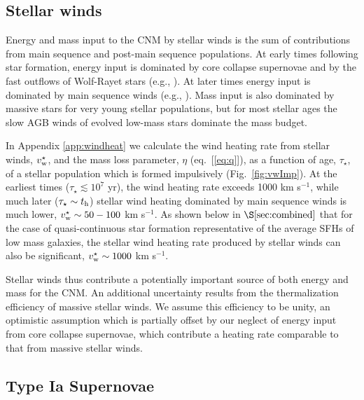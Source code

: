 \documentclass[usenatbib,fleqn]{mn2e}
\begin{document}
\subsection{Stellar winds} 

Energy and mass input to the CNM by stellar winds is the sum of contributions from main sequence and post-main sequence populations.  At early times following star formation, energy input is dominated by core collapse supernovae and by the fast outflows of Wolf-Rayet stars (e.g., \citealt{VossDiehl+:2009a}).  At later times energy input is dominated by main sequence winds (e.g., \citealt{NaimanSoares-Furtado+:2013a}).  Mass input is also dominated by massive stars for very young stellar populations, but for most stellar ages the slow AGB winds of evolved low-mass stars dominate the mass budget.  

In Appendix \ref{app:windheat} we calculate the wind heating rate from
stellar winds, $v_{\rm w}^{\star}$, and the mass loss parameter,
$\eta$ (eq.~[\ref{eq:q}]), as a function of age, $\tau_{\star}$, of a
stellar population which is formed impulsively (Fig.~\ref{fig:vwImp}).  
At the earliest times ($\tau_{\star} \lesssim 10^{7}$ yr), the wind
heating rate exceeds 1000 km s$^{-1}$, while much later ($\tau_{\star}
\sim t_{\rm h}$) stellar wind heating dominated by main sequence winds
is much lower, $v^{\star}_{\rm w} \sim 50-100 $ km s$^{-1}$.  As shown below in $\S\ref{sec:combined}$ that for the case of quasi-continuous star
formation representative of the average SFHs of low
mass galaxies, the stellar wind heating rate produced by stellar winds
can also be significant, $v_{\rm w}^{\star} \sim 1000$ km s$^{-1}$.  

Stellar winds thus contribute a potentially important source of both
energy and mass for the CNM.  An additional uncertainty results from the thermalization efficiency of massive stellar winds.  We assume this efficiency to be unity, an optimistic assumption which is partially offset by our neglect of energy input from core collapse supernovae, which contribute a heating rate comparable to that from massive stellar winds.  

\subsection{Type Ia Supernovae} 
\end{document}
